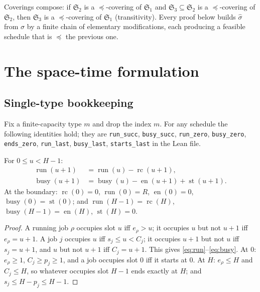 \documentclass[11pt,a4paper]{article}
\newcommand{\Sched}{\mathfrak{S}}
\newcommand{\Run}{\operatorname{run}}
\newcommand{\Busy}{\operatorname{busy}}
\newcommand{\Starts}{\operatorname{st}}
\newcommand{\Ends}{\operatorname{en}}
\newcommand{\Rc}{\operatorname{rc}}
\newcommand{\lean}[1]{\texttt{\small #1}}
\begin{document}
\begin{remark}
Coverings compose: if $\Sched_2$ is a $\preceq$-covering of $\Sched_1$ and
$\Sched_3\subseteq\Sched_2$ is a $\preceq$-covering of $\Sched_2$, then
$\Sched_3$ is a $\preceq$-covering of $\Sched_1$ (transitivity). Every proof
below builds $\hat\sigma$ from $\sigma$ by a finite chain of elementary
modifications, each producing a feasible schedule that is $\preceq$ the
previous one.
\end{remark}

\section{The space-time formulation}\label{sec:formulation}

\subsection{Single-type bookkeeping}

Fix a finite-capacity type $m$ and drop the index $m$. For any schedule the
following identities hold; they are \lean{run\_succ}, \lean{busy\_succ},
\lean{run\_zero}, \lean{busy\_zero}, \lean{ends\_zero}, \lean{run\_last},
\lean{busy\_last}, \lean{starts\_last} in the Lean file.

\begin{lemma}\label{lem:recurrences}
For $0\le u<H-1$:
\begin{align}
\Run(u+1) &= \Run(u)-\Rc(u+1),\label{eq:run}\\
\Busy(u+1) &= \Busy(u)-\Ends(u+1)+\Starts(u+1).\label{eq:busy}
\end{align}
At the boundary: $\Rc(0)=0$, $\Run(0)=R$, $\Ends(0)=0$,
$\Busy(0)=\Starts(0)$; and $\Run(H-1)=\Rc(H)$, $\Busy(H-1)=\Ends(H)$,
$\Starts(H)=0$.
\end{lemma}
\begin{proof}
A running job $\rho$ occupies slot $u$ iff $e_\rho>u$; it occupies $u$ but not
$u+1$ iff $e_\rho=u+1$. A job $j$ occupies $u$ iff $s_j\le u<C_j$; it occupies
$u+1$ but not $u$ iff $s_j=u+1$, and $u$ but not $u+1$ iff $C_j=u+1$. This
gives \eqref{eq:run}--\eqref{eq:busy}. At $0$: $e_\rho\ge1$, $C_j\ge p_j\ge1$,
and a job occupies slot $0$ iff it starts at $0$. At $H$: $e_\rho\le H$ and
$C_j\le H$, so whatever occupies slot $H-1$ ends exactly at $H$; and
$s_j\le H-p_j\le H-1$.
\end{proof}
\end{document}
